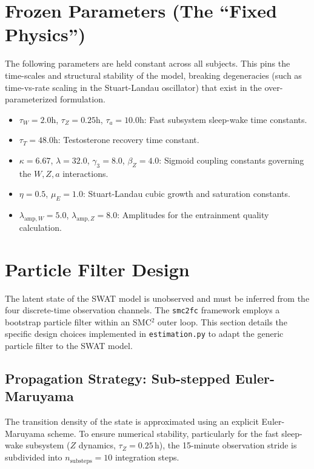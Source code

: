 \documentclass[11pt,a4paper]{article}
\begin{document}
\section{Frozen Parameters (The ``Fixed Physics'')}

The following parameters are held constant across all subjects. This pins the time-scales and structural stability of the model, breaking degeneracies (such as time-vs-rate scaling in the Stuart-Landau oscillator) that exist in the over-parameterized formulation.

\begin{itemize}
    \item $\tau_W = 2.0$h, $\tau_Z = 0.25$h, $\tau_a = 10.0$h: Fast subsystem sleep-wake time constants.
    \item $\tau_T = 48.0$h: Testosterone recovery time constant.
    \item $\kappa = 6.67$, $\lambda = 32.0$, $\gamma_3 = 8.0$, $\beta_Z = 4.0$: Sigmoid coupling constants governing the $W, Z, a$ interactions.
    \item $\eta = 0.5$, $\mu_E = 1.0$: Stuart-Landau cubic growth and saturation constants.
    \item $\lambda_{\text{amp},W} = 5.0$, $\lambda_{\text{amp},Z} = 8.0$: Amplitudes for the entrainment quality calculation.
\end{itemize}

\section{Particle Filter Design}

The latent state of the SWAT model is unobserved and must be inferred from the four discrete-time observation channels. The \texttt{smc2fc} framework employs a bootstrap particle filter within an SMC$^2$ outer loop. This section details the specific design choices implemented in \texttt{estimation.py} to adapt the generic particle filter to the SWAT model.

\subsection{Propagation Strategy: Sub-stepped Euler-Maruyama}
The transition density of the state is approximated using an explicit Euler-Maruyama scheme. To ensure numerical stability, particularly for the fast sleep-wake subsystem ($Z$ dynamics, $\tau_Z = 0.25$\,h), the 15-minute observation stride is subdivided into $n_{\text{substeps}} = 10$ integration steps. 
\end{document}
